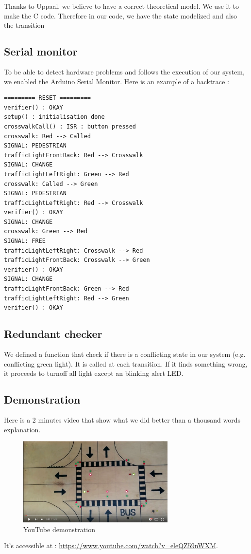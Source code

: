 Thanks to Uppaal, we believe to have a correct theoretical model. We use it to make the C code. Therefore in our code, we have the state modelized and also the transition

\subsection{Serial monitor}

To be able to detect hardware problems and follows the execution of our system, we enabled the Arduino Serial Monitor. Here is an example of a backtrace :

\begin{verbatim}
========= RESET =========
verifier() : OKAY
setup() : initialisation done
crosswalkCall() : ISR : button pressed
crosswalk: Red --> Called
SIGNAL: PEDESTRIAN
trafficLightFrontBack: Red --> Crosswalk
SIGNAL: CHANGE
trafficLightLeftRight: Green --> Red
crosswalk: Called --> Green
SIGNAL: PEDESTRIAN
trafficLightLeftRight: Red --> Crosswalk
verifier() : OKAY
SIGNAL: CHANGE
crosswalk: Green --> Red
SIGNAL: FREE
trafficLightLeftRight: Crosswalk --> Red
trafficLightFrontBack: Crosswalk --> Green
verifier() : OKAY
SIGNAL: CHANGE
trafficLightFrontBack: Green --> Red
trafficLightLeftRight: Red --> Green
verifier() : OKAY
\end{verbatim}

\subsection{Redundant checker}

We defined a function that check if there is a conflicting state in our system (e.g. conflicting green light). It is called at each transition. If it finds something wrong, it proceeds to turnoff all light except an blinking alert LED.


\subsection{Demonstration}

Here is a 2 minutes video that show what we did better than a thousand words explanation.

\begin{figure}[H]\label{fig:ytv}
  \centering
    \includegraphics[width=0.7\textwidth]{picture/demo.png}
    \caption{YouTube demonstration}
\end{figure}

It's accessible at :  \url{https://www.youtube.com/watch?v=eleQZ59nWXM}.